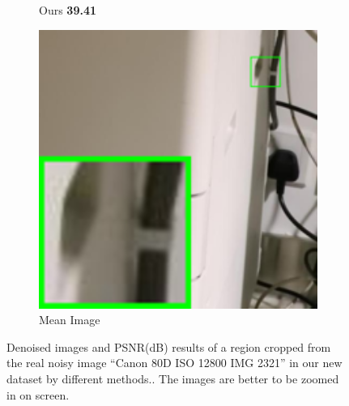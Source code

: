 \begin{figure}
\begin{subfigure}[t]{0.19\textwidth}
\caption{Ours \textbf{39.41}}
    \end{subfigure}
    \hfill
    \begin{subfigure}[t]{0.19\textwidth}
        \centering
        \includegraphics[width=1\textwidth]{images/guided/resize_br_Mean_Canon_80D_ISO12800_IMG_2321_part2.png}
\caption{Mean Image}
    \end{subfigure}
    \caption{Denoised images and PSNR(dB) results of a region cropped from the real noisy image ``Canon 80D ISO 12800 IMG 2321'' in our new dataset by different methods.. The images are better to be zoomed in on screen.}
    \label{fig3-18}
\end{figure}

